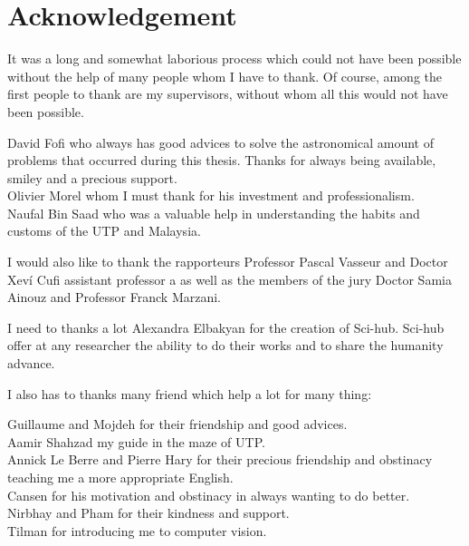 \documentclass[english]{spimubphdthesis}
\begin{document}
\chapter*{Acknowledgement}
%

It was a long and somewhat laborious process which could not have been possible without the help of many people whom I have to thank.
Of course, among the first people to thank are my supervisors, without whom all this would not have been possible.

David Fofi who always has good advices to solve the astronomical amount of problems that occurred during this thesis. Thanks for always being  available, smiley and a precious support.  \\
Olivier Morel whom I must thank for his investment and professionalism. \\
Naufal Bin Saad who was a valuable help in understanding the habits and customs of the UTP and Malaysia.

I would also like to thank the rapporteurs Professor Pascal Vasseur  and Doctor Xev\'i  Cufi assistant professor a as well as the members of the jury Doctor Samia Ainouz  and  Professor Franck Marzani. 

I need to thanks a lot Alexandra Elbakyan for the creation  of Sci-hub. Sci-hub offer at any researcher the ability to do their works and to share the humanity advance.

I also has to  thanks many friend which help a lot for many thing:

Guillaume and Mojdeh  for their friendship and good advices.\\
Aamir Shahzad my guide in the maze of UTP.\\
Annick Le Berre and Pierre Hary  for their precious friendship and obstinacy teaching me a more appropriate English.\\
Cansen for his motivation and obstinacy in always wanting to do better.\\
Nirbhay and Pham  for their kindness and support.\\
Tilman for introducing me to computer vision.\\
\end{document}
